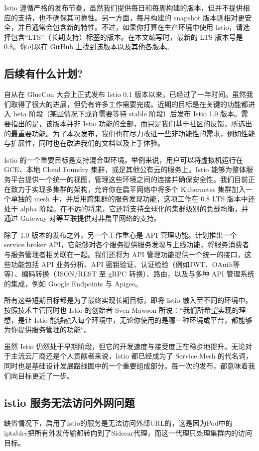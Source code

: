 \documentclass{ctexart}
\begin{document}
Istio 遵循严格的发布节奏，虽然我们提供每日和每周构建的版本，但并不提供相应的支持，也不确保其可靠性。另一方面，每月构建的 snapshot 版本则相对更安全，并且通常会包含新的特性。不过，如果你打算在生产环境中使用 Istio，请选择包含“LTS”（长期支持）标签的版本。在本文编写时，最新的 LTS 版本号是 0.8。你可以在 GitHub 上找到该版本以及其他各版本。

\subsection{后续有什么计划?}

自从在 GlueCon 大会上正式发布 Istio 0.1 版本以来，已经过了一年时间。虽然我们取得了很大的进展，但仍有许多工作需要完成。近期的目标是在关键的功能都进入 beta 阶段（某些情况下或许需要等待 stable 阶段）后发布 Istio 1.0 版本。需要指出的是，该版本并非 Istio 功能的全部，而只是我们基于社区的反馈，所选出的最重要功能。为了本次发布，我们也在尽力改进一些非功能性的需求，例如性能与扩展性，同时也在改进我们的文档以及上手体验。

Istio 的一个重要目标是支持混合型环境。举例来说，用户可以将虚拟机运行在 GCE、本地 Cloud Foundry 集群，或是其他公有云的服务上。Istio 能够为整体服务平台提供一个统一的视图，管理这些环境之间的连接并确保安全性。我们目前正在致力于实现多集群的架构，允许你在扁平网络中将多个 Kubernetes 集群加入一个单独的 mesh 中，并启用跨集群的服务发现功能，这项工作在 0.8 LTS 版本中还处于 alpha 阶段。在不远的将来，它还将支持全球化的集群级别的负载均衡，并通过 Gateway 对等互联提供对非扁平网络的支持。

除了 1.0 版本的发布之外，另一个工作重心是 API 管理功能。计划推出一个 service broker API，它能够对各个服务提供服务发现与上线功能，将服务消费者与服务管理者相关联在一起。我们还将为 API 管理功能提供一个统一的接口，这些功能包括 API 业务分析、API 密钥验证、认证检验（例如JWT、OAuth等等）、编码转换（JSON/REST 至 gRPC 转换）、路由，以及与多种 API 管理系统的集成，例如 Google Endpoints 与 Apigee。

所有这些短期目标都是为了最终实现长期目标，即将 Istio 融入至不同的环境中。按照技术主管同时也 Istio 的创始者 Sven Mawson 所说：“我们所希望实现的理想，是让 Istio 能够融入每个环境中，无论你使用的是哪一种环境或平台，都能够为你提供服务管理的功能“。

虽然 Istio 仍然处于早期阶段，但它的开发速度与接受度正在稳步地提升。无论对于主流云厂商还是个人贡献者来说，Istio 都已经成为了 Service Mesh 的代名词，同时也是基础设计发展路线图中的一个重要组成部分。每一次的发布，都意味着我们向目标更近了一步。
\subsection{istio 服务无法访问外网问题}
缺省情况下，启用了Istio的服务是无法访问外部URL的，这是因为Pod中的iptables把所有外发传输都转向到了Sidecar代理，而这一代理只处理集群内的访问目标。
\end{document}
